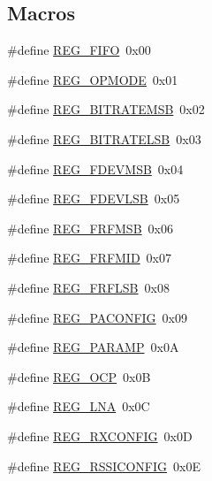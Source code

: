\subsection*{Macros}
\begin{DoxyCompactItemize}
\item 
\#define \hyperlink{sx1276Regs-Fsk_8h_a8ed1afe4fdc88a0f2626d9ee783e06e5}{R\+E\+G\+\_\+\+F\+I\+FO}~0x00
\item 
\#define \hyperlink{sx1276Regs-Fsk_8h_af3f25ba8cab1ad2c10ee96089d5a21be}{R\+E\+G\+\_\+\+O\+P\+M\+O\+DE}~0x01
\item 
\#define \hyperlink{sx1276Regs-Fsk_8h_a967024927a998c8b00e76015c0444d11}{R\+E\+G\+\_\+\+B\+I\+T\+R\+A\+T\+E\+M\+SB}~0x02
\item 
\#define \hyperlink{sx1276Regs-Fsk_8h_ab7321068986e253c5e0c4c00f592339b}{R\+E\+G\+\_\+\+B\+I\+T\+R\+A\+T\+E\+L\+SB}~0x03
\item 
\#define \hyperlink{sx1276Regs-Fsk_8h_ac9a9ad053f237a88ac9ef4e9f1eb6902}{R\+E\+G\+\_\+\+F\+D\+E\+V\+M\+SB}~0x04
\item 
\#define \hyperlink{sx1276Regs-Fsk_8h_a41b897af0ba110c4450e54887148acda}{R\+E\+G\+\_\+\+F\+D\+E\+V\+L\+SB}~0x05
\item 
\#define \hyperlink{sx1276Regs-Fsk_8h_a80711d5ed54cc1aa69666b92ea78c353}{R\+E\+G\+\_\+\+F\+R\+F\+M\+SB}~0x06
\item 
\#define \hyperlink{sx1276Regs-Fsk_8h_ad80489ab7d36cc8d9c725ab45f77c731}{R\+E\+G\+\_\+\+F\+R\+F\+M\+ID}~0x07
\item 
\#define \hyperlink{sx1276Regs-Fsk_8h_a3f6b75c6bcb9bb8631cd7fa7151dd934}{R\+E\+G\+\_\+\+F\+R\+F\+L\+SB}~0x08
\item 
\#define \hyperlink{sx1276Regs-Fsk_8h_a36b48e41982d4b0d0b6758a5e1ba398e}{R\+E\+G\+\_\+\+P\+A\+C\+O\+N\+F\+IG}~0x09
\item 
\#define \hyperlink{sx1276Regs-Fsk_8h_aff539bfb169523f9feb34a1d28daaa3f}{R\+E\+G\+\_\+\+P\+A\+R\+A\+MP}~0x0A
\item 
\#define \hyperlink{sx1276Regs-Fsk_8h_a4e0e13619868140039378bb218aa5a3b}{R\+E\+G\+\_\+\+O\+CP}~0x0B
\item 
\#define \hyperlink{sx1276Regs-Fsk_8h_ab08aa4c56ad75b3e715a1115330109ca}{R\+E\+G\+\_\+\+L\+NA}~0x0C
\item 
\#define \hyperlink{sx1276Regs-Fsk_8h_a6bba52e363d49d2783439eb8062d90c8}{R\+E\+G\+\_\+\+R\+X\+C\+O\+N\+F\+IG}~0x0D
\item 
\#define \hyperlink{sx1276Regs-Fsk_8h_a9ba1a67481c3ba0a454cb4873e4db10b}{R\+E\+G\+\_\+\+R\+S\+S\+I\+C\+O\+N\+F\+IG}~0x0E

\end{DoxyCompactItemize}
